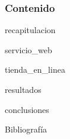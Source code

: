 \documentclass{beamer}
\begin{document}
  {
  \frame{\titlepage}}

  \begin{frame}
    \frametitle{Contenido}
    \setcounter{tocdepth}{1}
    \tableofcontents
  \end{frame}

  \setlength{\parskip}{0.5em}

  
    {recapitulacion}

  
    {servicio_web}

  
    {tienda_en_linea}

  
    {resultados}

  
    {conclusiones}

  \begin{frame}[allowframebreaks]{Bibliografía}
    \printbibliography
  \end{frame}

  \setlength{\parskip}{0.0em}

  {
  \frame{\titlepage}}
\end{document}
